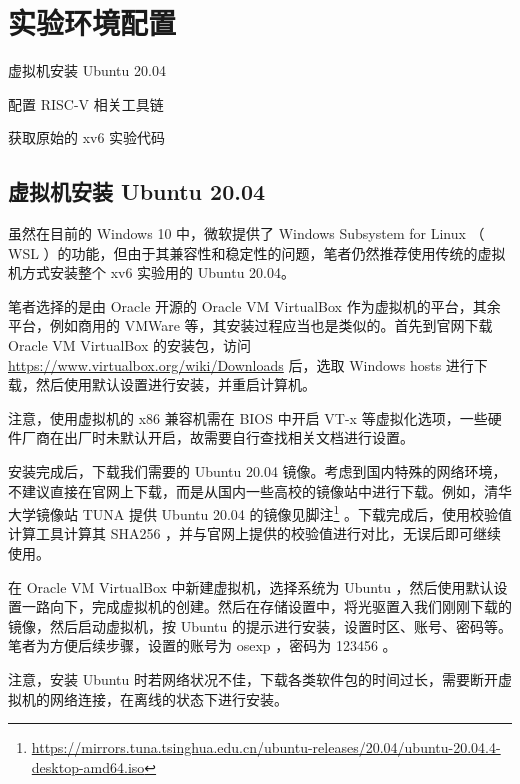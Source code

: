 \chapter{实验环境配置}
\begin{introduction}
    \item 虚拟机安装 Ubuntu 20.04
    \item 配置 RISC-V 相关工具链
    \item 获取原始的 xv6 实验代码
\end{introduction}

\section{虚拟机安装 Ubuntu 20.04}

虽然在目前的 Windows 10 中，微软提供了 Windows Subsystem for Linux （ WSL ）的功能，但由于其兼容性和稳定性的问题，笔者仍然推荐使用传统的虚拟机方式安装整个 xv6 实验用的 Ubuntu 20.04。

笔者选择的是由 Oracle 开源的 Oracle VM VirtualBox 作为虚拟机的平台，其余平台，例如商用的 VMWare 等，其安装过程应当也是类似的。首先到官网下载 Oracle VM VirtualBox 的安装包，访问 \url{https://www.virtualbox.org/wiki/Downloads} 后，选取 Windows hosts 进行下载，然后使用默认设置进行安装，并重启计算机。

\begin{theorem}[硬件虚拟化 VT-x] 
    注意，使用虚拟机的 x86 兼容机需在 BIOS 中开启 VT-x 等虚拟化选项，一些硬件厂商在出厂时未默认开启，故需要自行查找相关文档进行设置。
\end{theorem}

安装完成后，下载我们需要的 Ubuntu 20.04 镜像。考虑到国内特殊的网络环境，不建议直接在官网上下载，而是从国内一些高校的镜像站中进行下载。例如，清华大学镜像站 TUNA 提供 Ubuntu 20.04 的镜像见脚注\footnote{\url{https://mirrors.tuna.tsinghua.edu.cn/ubuntu-releases/20.04/ubuntu-20.04.4-desktop-amd64.iso}} 。下载完成后，使用校验值计算工具计算其 SHA256 ，并与官网上提供的校验值进行对比，无误后即可继续使用。

在 Oracle VM VirtualBox 中新建虚拟机，选择系统为 Ubuntu ，然后使用默认设置一路向下，完成虚拟机的创建。然后在存储设置中，将光驱置入我们刚刚下载的镜像，然后启动虚拟机，按 Ubuntu 的提示进行安装，设置时区、账号、密码等。笔者为方便后续步骤，设置的账号为 osexp ，密码为 123456 。

\begin{theorem} 
    注意，安装 Ubuntu 时若网络状况不佳，下载各类软件包的时间过长，需要断开虚拟机的网络连接，在离线的状态下进行安装。
\end{theorem}

